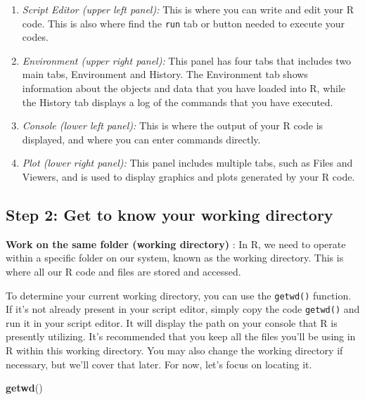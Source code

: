 \documentclass[
]{article}
\newenvironment{Shaded}{\begin{snugshade}}{\end{snugshade}}
\newcommand{\FunctionTok}[1]{\textcolor[rgb]{0.13,0.29,0.53}{\textbf{#1}}}
\newcommand{\NormalTok}[1]{#1}
\begin{document}
\begin{enumerate}
\def\labelenumi{\arabic{enumi}.}
\item
  \emph{Script Editor (upper left panel):} This is where you can write
  and edit your R code. This is also where find the \texttt{run} tab or
  button needed to execute your codes.
\item
  \emph{Environment (upper right panel):} This panel has four tabs that
  includes two main tabs, Environment and History. The Environment tab
  shows information about the objects and data that you have loaded into
  R, while the History tab displays a log of the commands that you have
  executed.
\item
  \emph{Console (lower left panel):} This is where the output of your R
  code is displayed, and where you can enter commands directly.
\item
  \emph{Plot (lower right panel):} This panel includes multiple tabs,
  such as Files and Viewers, and is used to display graphics and plots
  generated by your R code.
\end{enumerate}

\hypertarget{step-2-get-to-know-your-working-directory}{%
\subsection{Step 2: Get to know your working
directory}\label{step-2-get-to-know-your-working-directory}}

\textbf{Work on the same folder (working directory) }: In R, we need to
operate within a specific folder on our system, known as the working
directory. This is where all our R code and files are stored and
accessed.

To determine your current working directory, you can use the
\texttt{getwd()} function. If it's not already present in your script
editor, simply copy the code \texttt{getwd()} and run it in your script
editor. It will display the path on your console that R is presently
utilizing. It's recommended that you keep all the files you'll be using
in R within this working directory. You may also change the working
directory if necessary, but we'll cover that later. For now, let's focus
on locating it.

\begin{Shaded}
\begin{Highlighting}[]
\FunctionTok{getwd}\NormalTok{()}
\end{Highlighting}
\end{Shaded}
\end{document}
